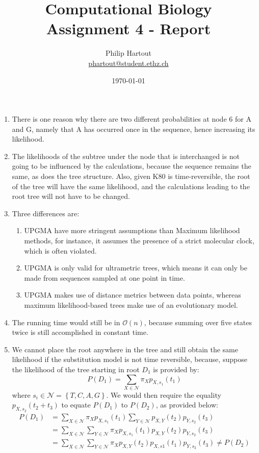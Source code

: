 \documentclass[a4paper,10pt,twoside]{article}
\title{Computational Biology \\ Assignment 4 - Report}
\author{Philip Hartout \\ \url{phartout@student.ethz.ch}}
\date{\today}
\begin{document}
\maketitle

\begin{enumerate}
   \item There is one reason why there are two different probabilities at node 6 for A and G, namely that A has occurred once in the sequence, hence increasing its likelihood.
   \item The likelihoods of the subtree under the node that is interchanged is not going to be influenced by the calculations, because the sequence remains the same, as does the tree structure. Also, given K80 is time-reversible, the root of the tree will have the same likelihood, and the calculations leading to the root tree will not have to be changed.
   \item Three differences are:
   \begin{enumerate}
       \item UPGMA have more stringent assumptions than Maximum likelihood methods, for instance, it assumes the presence of a strict molecular clock, which is often violated.
       \item UPGMA is only valid for ultrametric trees, which means it can only be made from sequences sampled at one point in time.
       \item UPGMA makes use of distance metrics between data points, whereas maximum likelihood-based trees make use of an evolutionary model.
   \end{enumerate}
   \item The running time would still be in $\mathcal{O}(n)$, because summing over five states twice is still accomplished in constant time.
   \item We cannot place the root anywhere in the tree and still obtain the same likelihood if the substitution model is not time reversible, because, suppose the likelihood of the tree starting in root $D_1$ is provided by:
   \begin{equation*}
        P(D_1) = \sum_{X\in \mathcal{N}} \pi_{X}p_{X,s_1}(t_1)
   \end{equation*}
   where $s_i\in \mathcal{N}=\left\{T,C,A,G\right\}$.
   We would then require the equality $p_{X,s_2}(t_2+t_3)$ to equate $P(D_1)$ to $P(D_2)$, as provided below:
   \begin{align*}
       P(D_1) &= \sum_{X\in \mathcal{N}} \pi_{X}p_{X,s_1}(t_1) \sum_{Y\in \mathcal{N}} p_{X,Y}(t_2)p_{Y,s_2}(t_3) \\
       &= \sum_{X\in \mathcal{N}}\sum_{Y\in \mathcal{N}}\pi_{X}p_{X,s_1}(t_1)p_{X,Y}(t_2)p_{Y, s_2}(t_3)\\
       &= \sum_{X\in \mathcal{N}}\sum_{Y\in \mathcal{N}}\pi_{X}p_{X,Y}(t_2)p_{X,s1}(t_1)p_{Y, s_2}(t_3)
       \neq P(D_2)
   \end{align*}

\end{enumerate}
\end{document}
